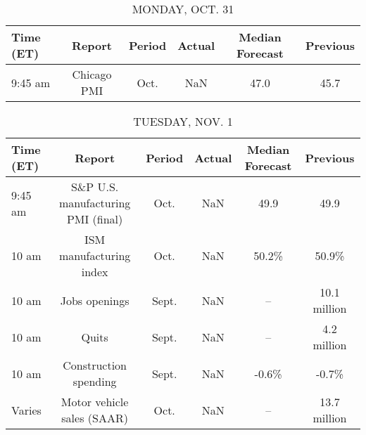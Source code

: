 \documentclass{article}%
\begin{document}
%
\normalsize%


\begin{table}[htbp]%
\caption{MONDAY, OCT. 31}%
\centering%
\begin{adjustbox}{width=1\textwidth}%
\begin{tabular}{lccccc}
\toprule
Time (ET) &      Report & Period & Actual & Median Forecast & Previous \\
\midrule
  9:45 am & Chicago PMI &   Oct. &    NaN &            47.0 &     45.7 \\
\bottomrule
\end{tabular}
%
\end{adjustbox}%
\end{table}

%


\begin{table}[htbp]%
\caption{TUESDAY, NOV. 1}%
\centering%
\begin{adjustbox}{width=1\textwidth}%
\begin{tabular}{lccccc}
\toprule
Time (ET) &                             Report & Period & Actual & Median Forecast &     Previous \\
\midrule
  9:45 am & S\&P U.S. manufacturing PMI (final) &   Oct. &    NaN &            49.9 &         49.9 \\
    10 am &            ISM manufacturing index &   Oct. &    NaN &           50.2\% &        50.9\% \\
    10 am &                      Jobs openings &  Sept. &    NaN &              -- & 10.1 million \\
    10 am &                              Quits &  Sept. &    NaN &              -- &  4.2 million \\
    10 am &              Construction spending &  Sept. &    NaN &           -0.6\% &        -0.7\% \\
   Varies &         Motor vehicle sales (SAAR) &   Oct. &    NaN &              -- & 13.7 million \\
\bottomrule
\end{tabular}
%
\end{adjustbox}%
\end{table}

%
\end{document}
